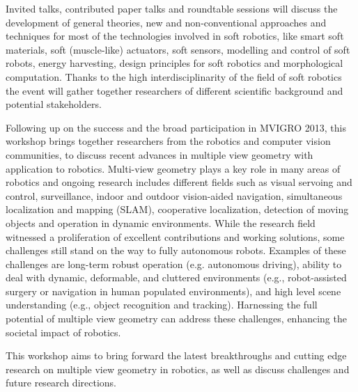 \begin{spacing}{1.0}
{Invited talks, contributed paper talks and roundtable sessions will discuss the development of general theories, new and non-conventional approaches and techniques for most of the technologies involved in soft robotics, like smart soft materials, soft (muscle-like) actuators, soft sensors, modelling and control of soft robots, energy harvesting, design principles for soft robotics and morphological computation. Thanks to the high interdisciplinarity of the field of soft robotics the event will gather together researchers of different scientific background and potential stakeholders.

}

{
Following up on the success and the broad participation in MVIGRO 2013, this workshop brings together researchers from the robotics and computer vision communities, to discuss recent advances in multiple view geometry with application to robotics. Multi-view geometry plays a key role in many areas of robotics and ongoing research includes different fields such as visual servoing and control, surveillance, indoor and outdoor vision-aided navigation, simultaneous localization and mapping (SLAM), cooperative localization, detection of moving objects and operation in dynamic environments. While the research field witnessed a proliferation of excellent contributions and working solutions, some challenges still stand on the way to fully autonomous robots. Examples of these challenges are long-term robust operation (e.g. autonomous driving), ability to deal with dynamic, deformable, and cluttered environments (e.g., robot-assisted surgery or navigation in human populated environments), and high level scene understanding (e.g., object recognition and tracking). Harnessing the full potential of multiple view geometry can address these challenges, enhancing the societal impact of robotics. 

This workshop aims to bring forward the latest breakthroughs and cutting edge research on multiple view geometry in robotics, as well as discuss challenges and future research directions. 
}



\end{spacing}
